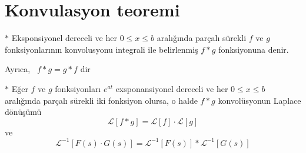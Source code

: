 \documentclass[11pt,a4paper]{article}
\begin{document}
\section{Konvulasyon teoremi}
$\ast$ Eksponsiyonel dereceli ve her $0\le x\le b$ aralığında parçalı sürekli $f$ ve $g$ fonksiyonlarının konvolusyonu
integrali ile belirlenmiş $f*g$ fonksiyonuna denir.

Ayrıca, \ $f*g = g*f$ dir

$\ast$ Eğer $f$ ve $g$ fonksiyonları $e^{at}$ exsponansiyonel dereceli ve her $0\le x\le b$ aralığında parçalı sürekli iki fonksiyon olursa, o halde $f*g$ konvolüsyonun Laplace dönüşümü
\[ \mathcal{L}[f*g] = \mathcal{L}[f]\cdot\mathcal{L}[g] \]
ve
\[ \mathcal{L}^{-1}[F(s)\cdot G(s)] = \mathcal{L}^{-1}[F(s)] * \mathcal{L}^{-1}[G(s)] \]
\end{document}
